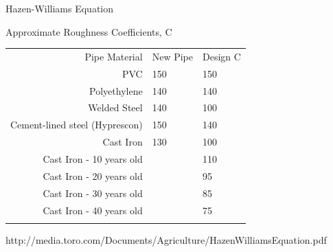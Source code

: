 \documentclass[9pt,xcolor={svgnames, x11names},mathpazo, professionalfonts]{beamer}
\begin{document}
\begin{frame}{Hazen-Williams Equation}
\end{frame}

\begin{frame}{Approximate Roughness Coefficients, C}
	
	\small
	\begin{center}
		\begin{tabular}{rll}
			\toprule
			\addlinespace
			Pipe Material                  & New Pipe & Design C \\
			\addlinespace
			\toprule
			\addlinespace
			PVC                            & 150      & 150      \\
			\addlinespace
			\midrule
			\addlinespace
			Polyethylene                   & 140      & 140      \\
			\addlinespace
			\midrule
			\addlinespace
			Welded Steel                   & 140      & 100      \\
			\addlinespace
			\midrule
			\addlinespace
			Cement-lined steel (Hyprescon) & 150      & 140      \\
			\addlinespace
			\midrule
			\addlinespace
			Cast Iron                      & 130      & 100      \\
			\addlinespace
			Cast Iron - 10 years old       &          & 110      \\
			\addlinespace
			Cast Iron - 20 years old       &          & 95       \\
			\addlinespace
			Cast Iron - 30 years old       &          & 85       \\
			\addlinespace
			Cast Iron - 40 years old       &          & 75       \\
			\addlinespace
			\bottomrule
		\end{tabular}
		
		\vspace{1cm}
		\tiny http://media.toro.com/Documents/Agriculture/HazenWilliamsEquation.pdf
	\end{center}
\end{frame}
\end{document}
